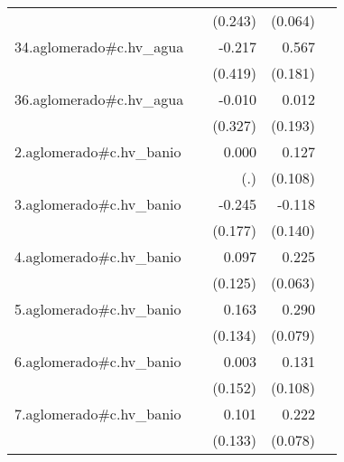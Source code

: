 {\begin{longtable}{l*{4}{D{.}{.}{-1}}}
            &                     &     (0.243)         &     (0.064)         &                     \\
\addlinespace
34.aglomerado#c.hv\_agua&                     &      -0.217         &       0.567\sym{**} &                     \\
            &                     &     (0.419)         &     (0.181)         &                     \\
\addlinespace
36.aglomerado#c.hv\_agua&                     &      -0.010         &       0.012         &                     \\
            &                     &     (0.327)         &     (0.193)         &                     \\
\addlinespace
2.aglomerado#c.hv\_banio&                     &       0.000         &       0.127         &                     \\
            &                     &         (.)         &     (0.108)         &                     \\
\addlinespace
3.aglomerado#c.hv\_banio&                     &      -0.245         &      -0.118         &                     \\
            &                     &     (0.177)         &     (0.140)         &                     \\
\addlinespace
4.aglomerado#c.hv\_banio&                     &       0.097         &       0.225\sym{***}&                     \\
            &                     &     (0.125)         &     (0.063)         &                     \\
\addlinespace
5.aglomerado#c.hv\_banio&                     &       0.163         &       0.290\sym{***}&                     \\
            &                     &     (0.134)         &     (0.079)         &                     \\
\addlinespace
6.aglomerado#c.hv\_banio&                     &       0.003         &       0.131         &                     \\
            &                     &     (0.152)         &     (0.108)         &                     \\
\addlinespace
7.aglomerado#c.hv\_banio&                     &       0.101         &       0.222\sym{**} &                     \\
            &                     &     (0.133)         &     (0.078)         &                     \\

\end{longtable}}
